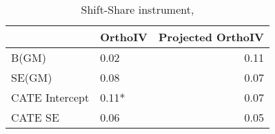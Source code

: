 \begin{table}\centering\caption{Shift-Share instrument, }\begin{tabular}{llr}
\toprule
                & OrthoIV   &   Projected OrthoIV \\
\midrule
 B(GM)          & 0.02      &                0.11 \\
 SE(GM)         & 0.08      &                0.07 \\
 CATE Intercept & 0.11*     &                0.07 \\
 CATE SE        & 0.06      &                0.05 \\
\bottomrule
\end{tabular}\end{table}